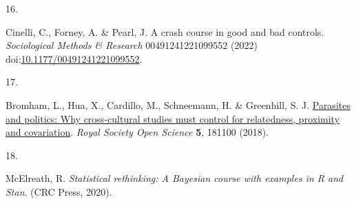\documentclass[
  man, donotrepeattitle,floatsintext]{apa6}
\newlength{\cslhangindent}
\newlength{\csllabelwidth}
\newlength{\cslentryspacingunit} %
\newenvironment{CSLReferences}[2] %
 {%
  \setlength{\parindent}{0pt}
  \ifodd #1
  \let\oldpar\par
  \def\par{\hangindent=\cslhangindent\oldpar}
  \fi
  \setlength{\parskip}{#2\cslentryspacingunit}
 }%
 {}
\newcommand{\CSLLeftMargin}[1]{\parbox[t]{\csllabelwidth}{#1}}
\newcommand{\CSLRightInline}[1]{\parbox[t]{\linewidth - \csllabelwidth}{#1}\break}
\begin{document}
\begin{CSLReferences}{0}{0}
\leavevmode{}%
\CSLLeftMargin{16. }%
\CSLRightInline{Cinelli, C., Forney, A. \& Pearl, J. A crash course in good and bad controls. \emph{Sociological Methods \& Research} 00491241221099552 (2022) doi:\href{https://doi.org/10.1177/00491241221099552}{10.1177/00491241221099552}.}

\leavevmode{}%
\CSLLeftMargin{17. }%
\CSLRightInline{Bromham, L., Hua, X., Cardillo, M., Schneemann, H. \& Greenhill, S. J. \href{https://doi.org/10.1098/rsos.181100}{Parasites and politics: Why cross-cultural studies must control for relatedness, proximity and covariation}. \emph{Royal Society Open Science} \textbf{5}, 181100 (2018).}

\leavevmode{}%
\CSLLeftMargin{18. }%
\CSLRightInline{McElreath, R. \emph{Statistical rethinking: A {B}ayesian course with examples in {R} and {Stan}}. (CRC Press, 2020).}

\end{CSLReferences}

\endgroup
\end{document}
